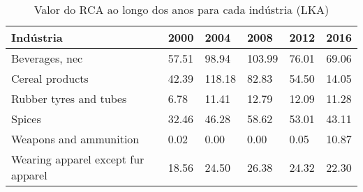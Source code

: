 \begin{table}
\centering
\caption{Valor do RCA ao longo dos anos para cada indústria (LKA)}
\begin{tabular}{p{6cm}p{1.5cm}p{1.5cm}p{1.5cm}p{1.5cm}p{1.5cm}}
\toprule
                         Indústria &  2000 &   2004 &   2008 &  2012 &  2016 \\
\midrule
                    Beverages, nec & 57.51 &  98.94 & 103.99 & 76.01 & 69.06 \\
                   Cereal products & 42.39 & 118.18 &  82.83 & 54.50 & 14.05 \\
            Rubber tyres and tubes &  6.78 &  11.41 &  12.79 & 12.09 & 11.28 \\
                            Spices & 32.46 &  46.28 &  58.62 & 53.01 & 43.11 \\
            Weapons and ammunition &  0.02 &   0.00 &   0.00 &  0.05 & 10.87 \\
Wearing apparel except fur apparel & 18.56 &  24.50 &  26.38 & 24.32 & 22.30 \\
\bottomrule
\end{tabular}
\end{table}
